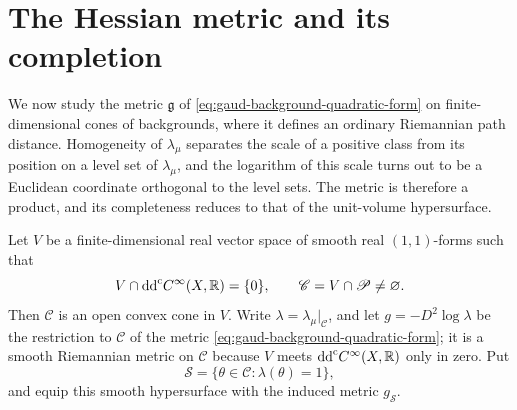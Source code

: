 \section{The Hessian metric and its completion}
\label{sec:gauduchon-metric-geometry}

We now study the metric $\mathfrak g$ of \eqref{eq:gaud-background-quadratic-form} on finite-dimensional cones of backgrounds, where it defines an ordinary Riemannian path distance. Homogeneity of $\lambda_\mu$ separates the scale of a positive class from its position on a level set of $\lambda_\mu$, and the logarithm of this scale turns out to be a Euclidean coordinate orthogonal to the level sets. The metric is therefore a product, and its completeness reduces to that of the unit-volume hypersurface.

Let $V$ be a finite-dimensional real vector space of smooth real $(1,1)$-forms such that
\[
 V\cap\mathrm{dd}^{\mathrm{c}} C^\infty(X,\mathbb R)=\{0\},
 \qquad \mathscr C=V\cap\mathscr P\ne\varnothing.
\]
Then $\mathscr C$ is an open convex cone in $V$. Write $\lambda=\lambda_\mu|_{\mathscr C}$, and let $g=-D^2\log\lambda$ be the restriction to $\mathscr C$ of the metric \eqref{eq:gaud-background-quadratic-form}; it is a smooth Riemannian metric on $\mathscr C$ because $V$ meets $\mathrm{dd}^{\mathrm{c}} C^\infty(X,\mathbb R)$ only in zero. Put
\[
 \mathscr S=\{\theta\in\mathscr C:\lambda(\theta)=1\},
\]
and equip this smooth hypersurface with the induced metric $g_{\mathscr S}$.

